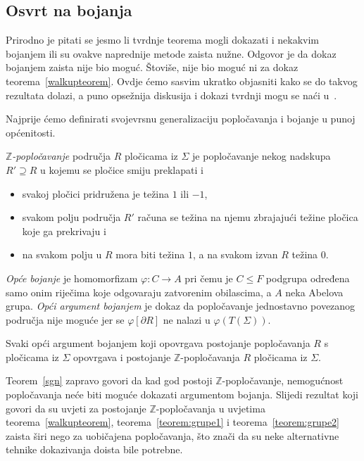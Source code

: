 \documentclass[11pt]{scrartcl}
\begin{document}
\subsection{Osvrt na bojanja}
Prirodno je pitati se jesmo li tvrdnje teorema mogli dokazati i nekakvim bojanjem ili su ovakve naprednije metode zaista nužne. Odgovor je da dokaz bojanjem zaista nije bio moguć. Štoviše, nije bio moguć ni za dokaz teorema~\ref{walkupteorem}. Ovdje ćemo sasvim ukratko objasniti kako se do takvog rezultata dolazi, a puno opsežnija diskusija i dokazi tvrdnji mogu se naći u~\cite{conway}.

Najprije ćemo definirati svojevrsnu generalizaciju popločavanja i bojanje u punoj općenitosti. 
\begin{definicija}
\emph{$\mathbb{Z}$-popločavanje} područja $R$ pločicama iz $\Sigma$ je popločavanje nekog nadskupa $R' \supseteq R$ u kojemu se pločice smiju preklapati i 
\begin{itemize}
\item svakoj pločici pridružena je težina $1$ ili $-1$,
\item svakom polju područja $R'$ računa se težina na njemu zbrajajući težine pločica koje ga prekrivaju i
\item na svakom polju u $R$ mora biti težina $1$, a na svakom izvan $R$ težina $0$.
\end{itemize}
\end{definicija}
\begin{definicija}
\emph{Opće bojanje} je homomorfizam $\varphi\colon C\to A$ pri čemu je $C\leq F$ podgrupa određena samo onim riječima koje odgovaraju zatvorenim obilascima, a $A$ neka Abelova grupa. \emph{Opći argument bojanjem} je dokaz da popločavanje jednostavno povezanog područja nije moguće jer se $\varphi[\partial R]$ ne nalazi u $\varphi(T(\Sigma))$. 
\end{definicija}
\begin{teorem} \label{sgn}
Svaki opći argument bojanjem koji opovrgava postojanje popločavanja $R$ s pločicama iz $\Sigma$ opovrgava i postojanje $\mathbb{Z}$-popločavanja $R$ pločicama iz $\Sigma$.
\end{teorem}
Teorem~\ref{sgn} zapravo govori da kad god postoji $\mathbb{Z}$-popločavanje, nemogućnost popločavanja neće biti moguće dokazati argumentom bojanja. Slijedi rezultat koji govori da su uvjeti za postojanje $\mathbb{Z}$-popločavanja u uvjetima teorema~\ref{walkupteorem}, teorema~\ref{teorem:grupe1} i teorema~\ref{teorem:grupe2} zaista širi nego za uobičajena popločavanja, što znači da su neke alternativne tehnike dokazivanja doista bile potrebne.
\end{document}
